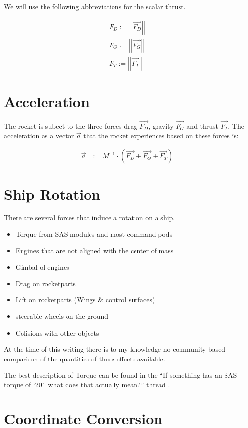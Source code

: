 \documentclass[11pt]{report}
\newcommand{\oa}[1]{\overrightarrow{#1}}
\newcommand{\F}[1]{\oa{F_{#1}}}
\newcommand{\absvec}[1]{\left|\left|{#1}\right|\right|}
\begin{document}
We will use the following abbreviations for the scalar thrust.

\begin{align}
  F_D := \absvec{\oa{F_D}}\nonumber\\
  F_G := \absvec{\oa{F_G}}\nonumber\\
  F_T := \absvec{\oa{F_T}}\nonumber
\end{align}

\chapter{Acceleration}

The rocket is subect to the three forces drag $\F{D}$, gravity $\F{G}$
and thrust $\F{T}$.  The  acceleration as a vector
$\oa{a}$ that the rocket experiences based on these forces is:

\begin{align}
  \oa{a} &:= M^{-1} \cdot(\F{D} + \F{G} + \F{T})
\end{align}

\chapter{Ship Rotation}

There are several forces that induce a rotation on a ship.

\begin{itemize}
\item {} Torque from SAS modules and most command pods
\item Engines that are not aligned with the center of mass
\item {} Gimbal of engines
\item Drag on rocketparts
\item Lift on rocketparts (Wings \& control surfaces)
\item steerable wheels on the ground
\item Colisions with other objects
\end{itemize}

At the time of this writing there is to my knowledge no
community-based comparison of the quantities of these effects
available.

The best description of Torque can be found in the ``If something has
an SAS torque of `20', what does that actually mean?'' thread
\cite{torque}.

\chapter{Coordinate Conversion}
\end{document}

